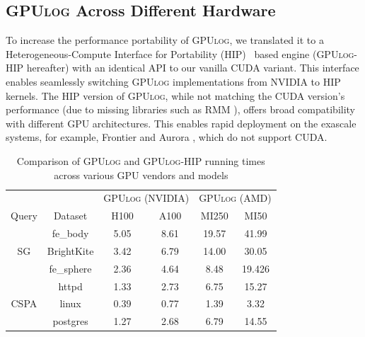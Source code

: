 \documentclass[nonacm,sigplan]{acmart}
\newcommand{\tool}{\textsc{GPUlog}}
\begin{document}
\subsection{\tool{} Across Different Hardware}
\label{sec:protablility}
To increase the performance portability of \tool{}, we translated it to a Heterogeneous-Compute Interface for Portability (HIP)~\cite{AMD_2024} based engine (\tool{}-HIP hereafter) with an identical API to our vanilla CUDA variant. This interface enables seamlessly switching \tool{} implementations from NVIDIA to HIP kernels. %
 The HIP version of \tool{}, while not matching the CUDA version's performance (due to missing libraries such as RMM \cite{librmm}), offers broad compatibility with different GPU architectures. This enables rapid deployment on the exascale systems, for example, Frontier and Aurora \cite{alcf-aurora,frontier}, which do not support CUDA.

\begin{table}[]
\fontsize{9}{11}\selectfont
\caption{\fontsize{9}{11}\selectfont Comparison of \tool{} and \tool{}-HIP running times across various GPU vendors and models } 
\begin{tabular}{@{}c|c|c|c||c|c@{}}
 \multicolumn{2}{c}{}          & \multicolumn{2}{c||}{\tool{} (NVIDIA)}    & \multicolumn{2}{c}{\tool{} (AMD)}      \\ 
 Query            & Dataset               & H100     & A100    & MI250    & MI50      \\ 
 \midrule
             & fe\_body       & 5.05     & 8.61    & 19.57    & 41.99     \\
SG           & BrightKite & 3.42     & 6.79    & 14.00    & 30.05     \\
             & fe\_sphere     & 2.36     & 4.64    & 8.48     & 19.426    \\ \midrule
             & \textsf{httpd}          & 1.33     & 2.73    & 6.75     & 15.27         \\
CSPA         & \textsf{linux}          & 0.39     & 0.77    & 1.39     & 3.32         \\
             & \textsf{postgres}     & 1.27     & 2.68    & 6.79     & 14.55         \\ \bottomrule
\end{tabular}
\label{tab:different-gpu}
\end{table}
\end{document}

